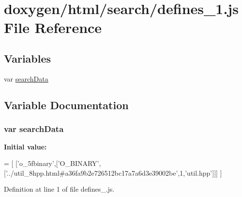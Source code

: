 \hypertarget{a00071}{}\section{doxygen/html/search/defines\+\_\+1.js File Reference}
\label{a00071}
\subsection*{Variables}
\begin{DoxyCompactItemize}
\item 
var \hyperlink{a00071_ad01a7523f103d6242ef9b0451861231e}{search\+Data}
\end{DoxyCompactItemize}


\subsection{Variable Documentation}
\hypertarget{a00071_ad01a7523f103d6242ef9b0451861231e}{}
\subsubsection[{search\+Data}]{\setlength{\rightskip}{0pt plus 5cm}var search\+Data}\label{a00071_ad01a7523f103d6242ef9b0451861231e}
{\bfseries Initial value\+:}
\begin{DoxyCode}
=
[
  [\textcolor{stringliteral}{'o\_5fbinary'},[\textcolor{stringliteral}{'O\_BINARY'},[\textcolor{stringliteral}{'../util\_8hpp.html#a36fa9b2e726512bc17a7a6d3e39002be'},1,\textcolor{stringliteral}{'util.hpp'}]]]
]
\end{DoxyCode}


Definition at line 1 of file defines\+\_.\+js.

